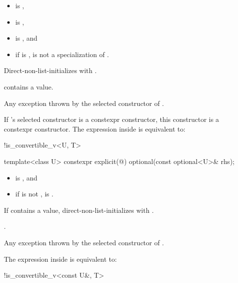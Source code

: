 \begin{itemdescr}
\pnum
\constraints
\begin{itemize}
\item {} is ,
\item {} is ,
\item {} is , and
\item if  is \cv{} ,
 is not a specialization of .
\end{itemize}

\pnum
\effects
Direct-non-list-initializes 
with .

\pnum
\ensures
{} contains a value.

\pnum
\throws
Any exception thrown by the selected constructor of .

\pnum
\remarks
If 's selected constructor is a constexpr constructor,
this constructor is a constexpr constructor.
The expression inside  is equivalent to:
\begin{codeblock}
!is_convertible_v<U, T>
\end{codeblock}
\end{itemdescr}

%
\begin{itemdecl}
template<class U> constexpr explicit(@\seebelow@) optional(const optional<U>& rhs);
\end{itemdecl}

\begin{itemdescr}
\pnum
\constraints
\begin{itemize}
\item {} is , and
\item if  is not \cv{} ,
 is .
\end{itemize}

\pnum
\effects
If  contains a value,
direct-non-list-initializes 
with .

\pnum
\ensures
{}.

\pnum
\throws
Any exception thrown by the selected constructor of .

\pnum
\remarks
The expression inside  is equivalent to:
\begin{codeblock}
!is_convertible_v<const U&, T>
\end{codeblock}
\end{itemdescr}

